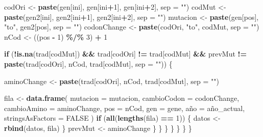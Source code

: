 \documentclass[
]{article}
\newenvironment{Shaded}{\begin{snugshade}}{\end{snugshade}}
\newcommand{\AttributeTok}[1]{\textcolor[rgb]{0.13,0.29,0.53}{#1}}
\newcommand{\ConstantTok}[1]{\textcolor[rgb]{0.56,0.35,0.01}{#1}}
\newcommand{\ControlFlowTok}[1]{\textcolor[rgb]{0.13,0.29,0.53}{\textbf{#1}}}
\newcommand{\DecValTok}[1]{\textcolor[rgb]{0.00,0.00,0.81}{#1}}
\newcommand{\FunctionTok}[1]{\textcolor[rgb]{0.13,0.29,0.53}{\textbf{#1}}}
\newcommand{\NormalTok}[1]{#1}
\newcommand{\OtherTok}[1]{\textcolor[rgb]{0.56,0.35,0.01}{#1}}
\newcommand{\SpecialCharTok}[1]{\textcolor[rgb]{0.81,0.36,0.00}{\textbf{#1}}}
\newcommand{\StringTok}[1]{\textcolor[rgb]{0.31,0.60,0.02}{#1}}
\begin{document}
\begin{Shaded}
\begin{Highlighting}[]
\NormalTok{            codOri }\OtherTok{\textless{}{-}} \FunctionTok{paste}\NormalTok{(gen[ini], gen[ini}\SpecialCharTok{+}\DecValTok{1}\NormalTok{], gen[ini}\SpecialCharTok{+}\DecValTok{2}\NormalTok{], }\AttributeTok{sep =} \StringTok{""}\NormalTok{)}
\NormalTok{            codMut }\OtherTok{\textless{}{-}} \FunctionTok{paste}\NormalTok{(gen2[ini], gen2[ini}\SpecialCharTok{+}\DecValTok{1}\NormalTok{], gen2[ini}\SpecialCharTok{+}\DecValTok{2}\NormalTok{], }\AttributeTok{sep =} \StringTok{""}\NormalTok{)}
\NormalTok{            mutacion }\OtherTok{\textless{}{-}} \FunctionTok{paste}\NormalTok{(gen[pos], }\StringTok{"to"}\NormalTok{, gen2[pos], }\AttributeTok{sep =} \StringTok{""}\NormalTok{)}
\NormalTok{            codonChange }\OtherTok{\textless{}{-}} \FunctionTok{paste}\NormalTok{(codOri, }\StringTok{"to"}\NormalTok{, codMut, }\AttributeTok{sep =} \StringTok{""}\NormalTok{)}
\NormalTok{            nCod }\OtherTok{\textless{}{-}}\NormalTok{ ((pos }\SpecialCharTok{{-}} \DecValTok{1}\NormalTok{) }\SpecialCharTok{\%/\%} \DecValTok{3}\NormalTok{) }\SpecialCharTok{+} \DecValTok{1}
            
            \ControlFlowTok{if}\NormalTok{ (}\SpecialCharTok{!}\FunctionTok{is.na}\NormalTok{(trad[codMut]) }\SpecialCharTok{\&\&}\NormalTok{ trad[codOri] }\SpecialCharTok{!=}\NormalTok{ trad[codMut] }\SpecialCharTok{\&\&}
\NormalTok{                prevMut }\SpecialCharTok{!=} \FunctionTok{paste}\NormalTok{(trad[codOri], nCod, trad[codMut], }\AttributeTok{sep =} \StringTok{""}\NormalTok{)) \{}
              
\NormalTok{              aminoChange }\OtherTok{\textless{}{-}} \FunctionTok{paste}\NormalTok{(trad[codOri], nCod, trad[codMut], }\AttributeTok{sep =} \StringTok{""}\NormalTok{)}
              
\NormalTok{                fila }\OtherTok{\textless{}{-}} \FunctionTok{data.frame}\NormalTok{(}
                  \AttributeTok{mutacion =}\NormalTok{ mutacion,}
                  \AttributeTok{cambioCodon =}\NormalTok{ codonChange,}
                  \AttributeTok{cambioAmino =}\NormalTok{ aminoChange,}
                  \AttributeTok{pos =}\NormalTok{ nCod,}
                  \AttributeTok{gen =}\NormalTok{ gene,}
\NormalTok{                  año }\OtherTok{=}\NormalTok{ año\_actual,}
                  \AttributeTok{stringsAsFactors =} \ConstantTok{FALSE}
\NormalTok{                )              }
                \ControlFlowTok{if}\NormalTok{ (}\FunctionTok{all}\NormalTok{(}\FunctionTok{lengths}\NormalTok{(fila) }\SpecialCharTok{==} \DecValTok{1}\NormalTok{)) \{}
\NormalTok{                datos }\OtherTok{\textless{}{-}} \FunctionTok{rbind}\NormalTok{(datos, fila)}
\NormalTok{              \}}
\NormalTok{              prevMut }\OtherTok{\textless{}{-}}\NormalTok{ aminoChange}
\NormalTok{            \}}
\NormalTok{          \}}
\NormalTok{        \}}
\NormalTok{      \}}
\NormalTok{    \}}
\NormalTok{  \}}
\NormalTok{\}}
\end{Highlighting}
\end{Shaded}
\end{document}
